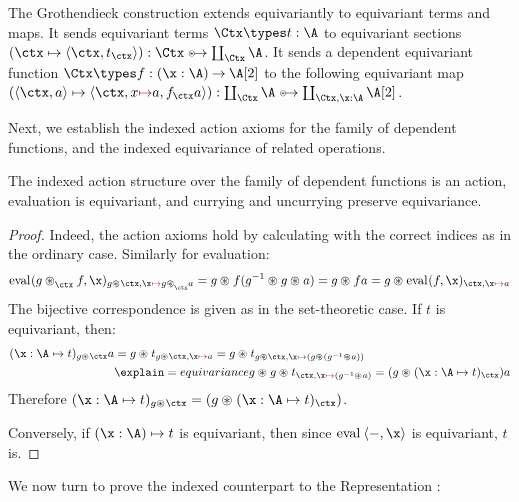 \begin{example}
The Grothendieck construction extends equivariantly to equivariant
terms and maps.  It sends equivariant terms $\Ctx \types t : \A$ to
equivariant sections \((\fun \ctx \pair{\ctx}{t_{\ctx}}) : \Ctx
\equito \coprod_{\Ctx}\A \). It sends a dependent equivariant function
$\Ctx \types f : \DFun\x\A \B$ to the following equivariant map
$\parent{\fun{\pair\ctx a}\pair{\ctx, \For x a}{f_{\ctx}a}} :
\coprod_{\Ctx}\A \equito \coprod_{\Ctx, \x : \A}\B$.
\end{example}

Next, we establish the indexed action axioms for the family of
dependent functions, and the indexed equivariance of related
operations.

\begin{lemma}
  The indexed action structure over the family of dependent functions
  is an action, evaluation is equivariant, and currying and uncurrying
  preserve equivariance.
\end{lemma}
\begin{proof}
  Indeed, the action axioms hold by calculating with the correct
  indices as in the ordinary case. Similarly for evaluation:
  \[
  \eval(g\iact{\ctx} f,\x)_{g\act \ctx, \For \x g\iact\ctx a}
  =
  g \iact{} f(\inv g \iact{} g \iact{} a)
  =
  g \iact{} fa
  =
  g\iact{}\eval(f, \x)_{\ctx, \For\x a}
  \]
  The bijective correspondence is given as in the set-theoretic
  case. If $t$ is equivariant, then:
  \begin{align*}
  (\fun{\x:\A}t)_{g \act \ctx}a &=
  g \iact{} t_{g\act \ctx, \For\x a}
  =
  g \iact{} t_{g\act \ctx, \For\x (g \act (\inv g \act a))}
  \\&\explain={equivariance}
  g \iact{} g\iact{} t_{\ctx, \For\x (\inv g \act a)}
  =
  (g \iact{} (\fun{\x : \A}t)_{\ctx})a
  \end{align*}
  Therefore $(\fun{\x:\A}t)_{g \act \ctx} = (g \iact{} (\fun{\x : \A}t)_{\ctx})$.

  Conversely, if $\fun{(\x:\A)}t$ is equivariant, then since
  $\eval\pair{-}\x$ is equivariant, $t$ is.
\end{proof}



We now turn to prove the indexed counterpart to the \WLOG{}
Representation :

